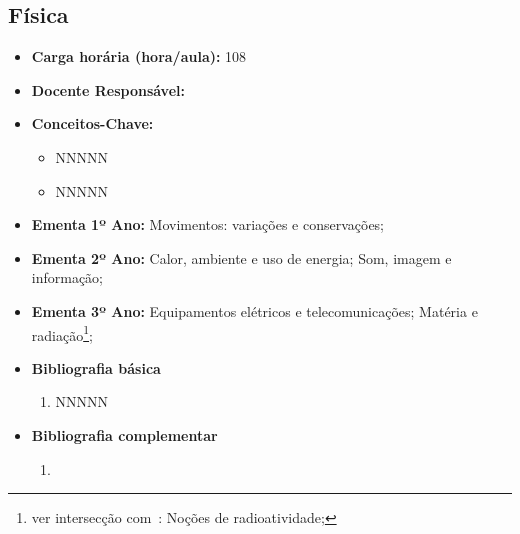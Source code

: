 \documentclass[11pt,fleqn]{book} %
\begin{document}
\newpage
\subsection{Física}\label{disc:fisica}
\begin{itemize}
	\item \textbf{Carga horária (hora/aula):} 108
	\item \textbf{Docente Responsável:}
	\item \textbf{Conceitos-Chave:}
	\begin{itemize}
		\item NNNNN
		\item NNNNN
	\end{itemize}
	\item \textbf{Ementa 1º Ano:} 
	Movimentos: variações e conservações;
	\item \textbf{Ementa 2º Ano:}	
	Calor, ambiente e uso de energia;
	Som, imagem e informação;
	\item \textbf{Ementa 3º Ano:}	
	Equipamentos elétricos e telecomunicações;
	Matéria e radiação\footnote{ver intersecção com~: Noções de radioatividade;};
	\item \textbf{Bibliografia básica}
	\begin{enumerate}
		\item NNNNN
	\end{enumerate}
	\item \textbf{Bibliografia complementar}
	\begin{enumerate}
		\item 
	\end{enumerate}	
\end{itemize}



\newpage
\end{document}
